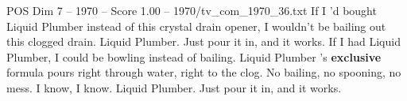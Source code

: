 \begin{textsample}{POS Dim 7 – 1970 – Score 1.00 – 1970/tv\_com\_1970\_36.txt}  \label{ex:f7_pos_039}
If I 'd bought Liquid Plumber instead of this crystal drain opener, I wouldn't be bailing out this clogged drain.
Liquid Plumber.
Just pour it in, and it works.
If I had Liquid Plumber, I could be bowling instead of bailing.
Liquid Plumber 's \textbf{exclusive} formula pours right through water, right to the clog.
No bailing, no spooning, no mess.
I know, I know.
Liquid Plumber.
Just pour it in, and it works.

\end{textsample}
